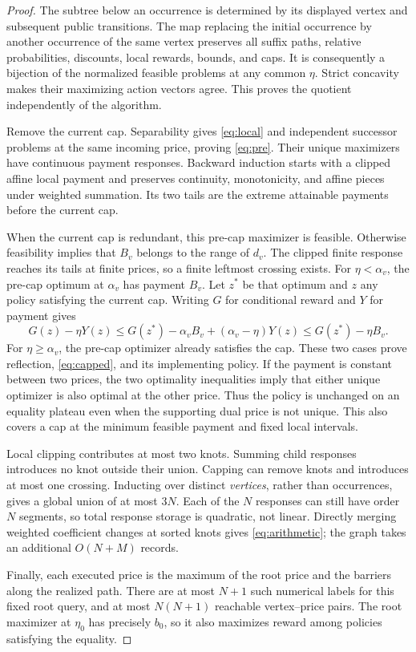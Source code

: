 \begin{proof}
The subtree below an occurrence is determined by its displayed vertex and subsequent public transitions. The map replacing the initial occurrence by another occurrence of the same vertex preserves all suffix paths, relative probabilities, discounts, local rewards, bounds, and caps. It is consequently a bijection of the normalized feasible problems at any common $\eta$. Strict concavity makes their maximizing action vectors agree. This proves the quotient independently of the algorithm.

Remove the current cap. Separability gives \eqref{eq:local} and independent successor problems at the same incoming price, proving \eqref{eq:pre}. Their unique maximizers have continuous payment responses. Backward induction starts with a clipped affine local payment and preserves continuity, monotonicity, and affine pieces under weighted summation. Its two tails are the extreme attainable payments before the current cap.

When the current cap is redundant, this pre-cap maximizer is feasible. Otherwise feasibility implies that $B_v$ belongs to the range of $d_v$. The clipped finite response reaches its tails at finite prices, so a finite leftmost crossing exists. For $\eta<\alpha_v$, the pre-cap optimum at $\alpha_v$ has payment $B_v$. Let $z^*$ be that optimum and $z$ any policy satisfying the current cap. Writing $G$ for conditional reward and $Y$ for payment gives
\[
 G(z)-\eta Y(z)\leq G(z^*)-\alpha_v B_v+(\alpha_v-\eta)Y(z)
 \leq G(z^*)-\eta B_v.
\]
For $\eta\geq\alpha_v$, the pre-cap optimizer already satisfies the cap. These two cases prove reflection, \eqref{eq:capped}, and its implementing policy. If the payment is constant between two prices, the two optimality inequalities imply that either unique optimizer is also optimal at the other price. Thus the policy is unchanged on an equality plateau even when the supporting dual price is not unique. This also covers a cap at the minimum feasible payment and fixed local intervals.

Local clipping contributes at most two knots. Summing child responses introduces no knot outside their union. Capping can remove knots and introduces at most one crossing. Inducting over distinct \emph{vertices}, rather than occurrences, gives a global union of at most $3N$. Each of the $N$ responses can still have order $N$ segments, so total response storage is quadratic, not linear. Directly merging weighted coefficient changes at sorted knots gives \eqref{eq:arithmetic}; the graph takes an additional $O(N+M)$ records.

Finally, each executed price is the maximum of the root price and the barriers along the realized path. There are at most $N+1$ such numerical labels for this fixed root query, and at most $N(N+1)$ reachable vertex--price pairs. The root maximizer at $\eta_0$ has precisely $b_0$, so it also maximizes reward among policies satisfying the equality.\end{proof}

